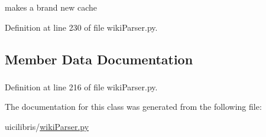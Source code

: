makes a brand new cache 



\-Definition at line 230 of file wiki\-Parser.\-py.



\subsection{\-Member \-Data \-Documentation}
\hypertarget{classuicilibris_1_1wikiParser_1_1txtFileCacher_a7c536ba77eac75fcc8a57307e062e63f}{
\subsubsection[{old\-Wiki2}]{}}\label{classuicilibris_1_1wikiParser_1_1txtFileCacher_a7c536ba77eac75fcc8a57307e062e63f}


\-Definition at line 216 of file wiki\-Parser.\-py.



\-The documentation for this class was generated from the following file\-:\begin{DoxyCompactItemize}
\item 
uicilibris/\hyperlink{wikiParser_8py}{wiki\-Parser.\-py}\end{DoxyCompactItemize}
